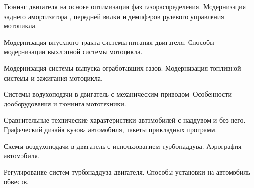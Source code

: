 \documentclass[
	14pt,
	a4paper,
	]
	{scrartcl}
\begin{document}
\vfill

\newpage


\shapk
{}
\setcounter{zad}{0}

\vfill
\z Тюнинг двигателя на основе оптимизации фаз газораспределения.
 \vfill
\z Модернизация заднего амортизатора , передней вилки и демпферов рулевого управления мотоцикла.
 \vfill

\vfill

\newpage


\shapk
{}
\setcounter{zad}{0}

\vfill
\z Модернизация впускного тракта системы питания двигателя.
 \vfill
\z Способы модернизации выхлопной системы мотоцикла.
 \vfill

\vfill

\newpage


\shapk
{}
\setcounter{zad}{0}

\vfill
\z Модернизация системы выпуска отработавших газов.
 \vfill
\z Модернизация топливной системы и зажигания мотоцикла.
 \vfill

\vfill

\newpage


\shapk
{}
\setcounter{zad}{0}

\vfill
\z Системы водухоподачи в двигатель с механическим приводом.
 \vfill
\z Особенности дооборудования и тюнинга мототехники.
 \vfill

\vfill

\newpage


\shapk
{}
\setcounter{zad}{0}

\vfill
\z Сравнительные технические характеристики автомобилей с наддувом и без него.
 \vfill
\z Графический дизайн кузова автомобиля, пакеты прикладных программ.
 \vfill

\vfill

\newpage


\shapk
{}
\setcounter{zad}{0}

\vfill
\z Схемы воздухоподачи в двигатель с использованием турбонаддува.
 \vfill
\z Аэрография автомобиля.
 \vfill

\vfill

\newpage


\shapk
{}
\setcounter{zad}{0}

\vfill
\z Регулирование систем турбонаддува двигателя.
 \vfill
\z Способы установки на автомобиль обвесов.
 \vfill
\end{document}
